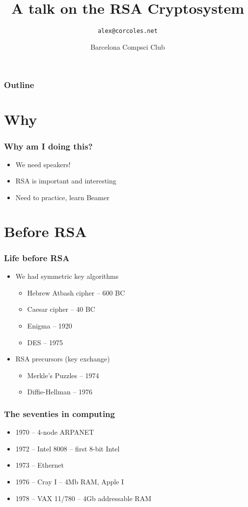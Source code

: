 \documentclass{beamer}
\title{A talk on the RSA Cryptosystem}
\author{\texttt{alex@corcoles.net}}
\date{Barcelona Compsci Club}
\begin{document}
\begin{frame}
	\titlepage
\end{frame}

\begin{frame}
	\frametitle{Outline}
	\tableofcontents
\end{frame}

\section{Why}

\begin{frame}
	\frametitle{Why am I doing this?}
	\begin{itemize}
		\item We need speakers!
		\item RSA is important and interesting
		\item Need to practice, learn Beamer
	\end{itemize}
\end{frame}

\section{Before RSA}

\begin{frame}
	\frametitle{Life before RSA}
	\begin{itemize}
		\item We had symmetric key algorithms
		\begin{itemize}
			\item Hebrew Atbash cipher -- 600 BC
			\item Caesar cipher -- 40 BC
			\item Enigma -- 1920
			\item DES -- 1975
		\end{itemize}
		\item RSA precursors (key exchange)
		\begin{itemize}
			\item Merkle's Puzzles -- 1974
			\item Diffie-Hellman -- 1976
		\end{itemize}
		
	\end{itemize}
\end{frame}

\begin{frame}
	\frametitle{The seventies in computing}
	\begin{itemize}
		\item 1970 -- 4-node ARPANET
		\item 1972 -- Intel 8008 -- first 8-bit Intel
		\item 1973 -- Ethernet
		\item 1976 -- Cray I -- 4Mb RAM, Apple I
		\item 1978 -- VAX 11/780 -- 4Gb addressable RAM
	\end{itemize}
\end{frame}
\end{document}
